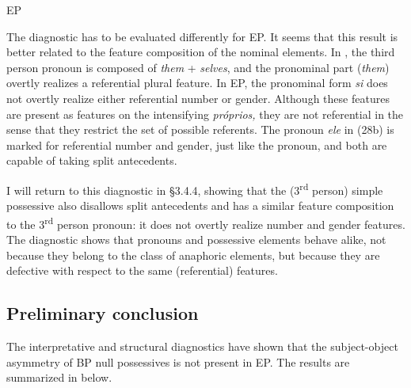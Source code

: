 \documentclass[output=paper]{langsci/langscibook}
\begin{document}
\ea%
    EP\label{ex:wein:28}\\
    \z
\z

The diagnostic has to be evaluated differently for EP. It seems that this result is better related to the feature composition of the nominal elements. In , the third person  pronoun is composed of \textit{them} + \textit{selves}, and the pronominal part (\textit{them}) overtly realizes a referential plural feature. In EP, the pronominal form \textit{si} does not overtly realize either referential number or gender. Although these features are present as  features on the intensifying  \textit{próprios,} they are not referential in the sense that they restrict the set of possible referents. The pronoun \textit{ele} in (28b) is marked for referential number and gender, just like the   pronoun, and both are capable of taking split antecedents.

I will return to this diagnostic in §3.4.4, showing that the (3\textsuperscript{rd} person) simple possessive also disallows split antecedents and has a similar feature composition to the 3\textsuperscript{rd} person  pronoun: it does not overtly realize number and gender features. The diagnostic shows that  pronouns and possessive elements behave alike, not because they belong to the class of anaphoric elements, but because they are defective with respect to the same (referential) features.

\subsection{Preliminary conclusion}%

The interpretative and structural diagnostics have shown that the subject-object asymmetry of BP null possessives is not present in EP. The results are summarized in  below.
\end{document}
